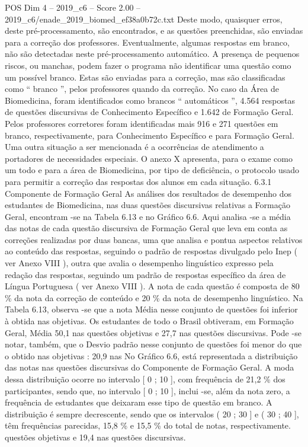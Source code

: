 \begin{textsample}{POS Dim 4 – 2019\_c6 – Score 2.00 – 2019\_c6/enade\_2019\_biomed\_ef38a0b72c.txt}
Deste modo, quaisquer erros, deste pré-processamento, são encontrados, e as questões preenchidas, são enviadas para a correção dos professores.
Eventualmente, algumas respostas em branco, não são detectadas neste pré-processamento automático.
A presença de pequenos riscos, ou manchas, podem fazer o programa não identificar uma questão como um possível branco.
Estas são enviadas para a correção, mas são classificadas como “ branco ”, pelos professores quando da correção.
No caso da Área de Biomedicina, foram identificados como brancos “ automáticos ”, 4.564 respostas de questões discursivas de Conhecimento Específico e 1.642 de Formação Geral.
Pelos professores corretores foram identificadas mais 916 e 271 questões em branco, respectivamente, para Conhecimento Específico e para Formação Geral.
Uma outra situação a ser mencionada é a ocorrências de atendimento a portadores de necessidades especiais.
O anexo X apresenta, para o exame como um todo e para a área de Biomedicina, por tipo de deficiência, o protocolo usado para permitir a correção das respostas dos alunos em cada situação. 6.3.1 Componente de Formação Geral As análises dos resultados de desempenho dos estudantes de Biomedicina, nas duas questões discursivas relativas a Formação Geral, encontram -se na Tabela 6.13 e no Gráfico 6.6.
Aqui analisa -se a média das notas de cada questão discursiva de Formação Geral que leva em conta as correções realizadas por duas bancas, uma que analisa e pontua aspectos relativos ao conteúdo das respostas, seguindo o padrão de respostas divulgado pelo Inep ( ver Anexo VIII ), outra que avalia o desempenho linguístico expresso pela redação das respostas, seguindo um padrão de respostas específico da área de Língua Portuguesa ( ver Anexo VIII ).
A nota de cada questão é composta de 80 \% da nota da correção de conteúdo e 20 \% da nota de desempenho linguístico.
Na Tabela 6.13, observa -se que a nota Média nesse conjunto de questões foi inferior à obtida nas objetivas.
Os estudantes de todo o Brasil obtiveram, em Formação Geral, Média 50,1 nas questões objetivas e 27,7 nas questões discursivas.
Pode -se notar, também, que o Desvio padrão nesse conjunto de questões foi menor do que o obtido nas objetivas : 20,9 nas No Gráfico 6.6, está representada a distribuição das notas nas questões discursivas do Componente de Formação Geral.
A moda dessa distribuição ocorre no intervalo [ 0 ; 10 ], com frequência de 21,2 \% dos participantes, sendo que, no intervalo [ 0 ; 10 ], inclui -se, além da nota zero, a frequência de estudantes que deixaram esse tipo de questão em branco.
A distribuição é sempre decrescente, sendo que os intervalos ( 20 ; 30 ] e ( 30 ; 40 ], têm frequências parecidas, 15,8 \% e 15,5 \% do total de notas, respectivamente. questões objetivas e 19,4 nas questões discursivas.

\end{textsample}
